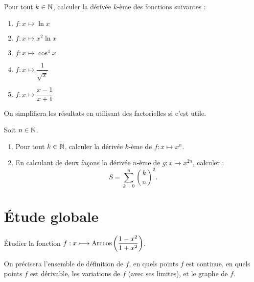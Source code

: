 \begin{corr}
\end{corr}

\begin{exo}
Pour tout \(k\in\mathbb{N}\), calculer la dérivée \(k\)-ème des fonctions suivantes :

\begin{enumerate}
\item \(f:x\mapsto\ln x\) \\

\item \(f:x\mapsto x^2\ln x\) \\

\item \(f:x\mapsto\cos^4x\) \\

\item \(f:x\mapsto\dfrac{1}{\sqrt{x}}\) \\

\item \(f:x\mapsto\dfrac{x-1}{x+1}\)
\end{enumerate}

On simplifiera les résultats en utilisant des factorielles si c'est utile.
\end{exo}

\begin{corr}
\end{corr}

\begin{exo}
Soit \(n\in\mathbb{N}\).

\begin{enumerate}
\item Pour tout \(k\in\mathbb{N}\), calculer la dérivée \(k\)-ème de \(f:x\mapsto x^n\). \\

\item En calculant de deux façons la dérivée \(n\)-ème de \(g:x\mapsto x^{2n}\), calculer : \[S=\sum_{k=0}^n\binom{k}{n}^2.\]
\end{enumerate}
\end{exo}

\begin{corr}
\end{corr}

\section{Étude globale}

\begin{exo}
Étudier la fonction \(f:x\longmapsto\operatorname{Arccos}\left(\dfrac{1-x^2}{1+x^2}\right)\).

On précisera l'ensemble de définition de \(f\), en quels points \(f\) est continue, en quels points \(f\) est dérivable, les variations de \(f\) (avec ses limites), et le graphe de \(f\).
\end{exo}

